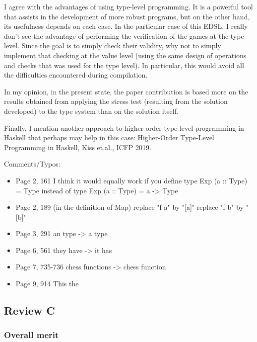 I agree with the advantages of using type-level programming. It is a powerful tool that assists in the development of more robust programs, but on the other hand, its usefulness depends on each case. In the particular case of this EDSL, I really don't see the advantage of performing the verification of the games at the type level. Since the goal is to simply check their validity, why not to simply implement that checking at the value level (using the same design of operations and checks that was used for the type level). In particular, this would avoid all the difficulties encountered during compilation.

In my opinion, in the present state, the paper contribution is based more on the results obtained from applying the stress test (resulting from the solution developed) to the type system than on the solution itself.

Finally, I mention another approach to higher order type level programming in Haskell that perhaps may help in this case: Higher-Order Type-Level Programming in Haskell, Kiss et.al., ICFP 2019.

Comments/Typos:

\begin{itemize}
      \item Page 2, 161
            I think it would equally work if you define
            type Exp (a :: Type) = Type
            instead of
            type Exp (a :: Type) = a -> Type

      \item Page 2, 189 (in the definition of Map)
            replace "f a" by "[a]"
            replace "f b" by "[b]"

      \item Page 3, 291
            an type -> a type

      \item Page 6, 561
            they have -> it has

      \item Page 7, 735-736
            chess functions -> chess function

      \item Page 9, 914
            This the
\end{itemize}

\subsection{Review C}

\subsubsection{Overall merit}

